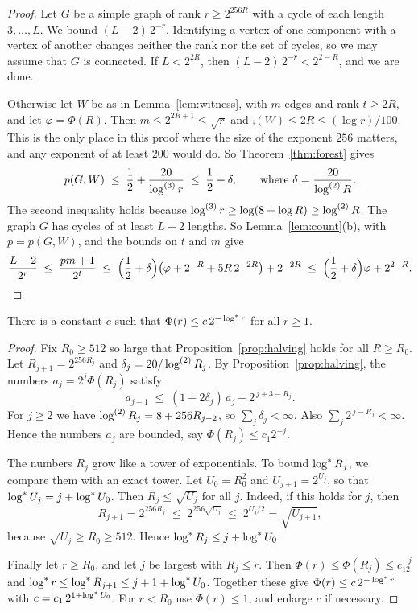 \begin{proof}
Let $G$ be a simple graph of rank $r\ge2^{256R}$ with a cycle of each length $3,\dots,L$. We bound
$(L-2)\,2^{-r}$. Identifying a vertex of one component with a vertex of another changes neither the
rank nor the set of cycles, so we may assume that $G$ is connected. If $L<2^{2R}$, then
$(L-2)\,2^{-r}<2^{2-R}$, and we are done.

Otherwise let $W$ be as in Lemma~\ref{lem:witness}, with $m$ edges and rank $t\ge2R$, and let
$\varphi=\Phi(R)$. Then $m\le2^{2R+1}\le\sqrt r$ and $\comp(W)\le2R\le(\log r)/100$. This is
the only place in this proof where the size of the exponent $256$ matters, and any exponent of at
least $200$ would do.
So Theorem~\ref{thm:forest} gives
\[
  p(G,W)\;\le\;\frac12+\frac{20}{\log^{(3)}r}\;\le\;\frac12+\delta,
  \qquad\text{where }\delta=\frac{20}{\log^{(2)}R}.
\]
The second inequality holds because $\log^{(3)}r\ge\log(8+\log R)\ge\log^{(2)}R$. The graph $G$ has cycles of
at least $L-2$ lengths. So Lemma~\ref{lem:count}(b), with $p=p(G,W)$, and the bounds on $t$ and $m$
give
\[
  \frac{L-2}{2^{r}}\;\le\;\frac{pm+1}{2^{t}}
  \;\le\;\Bigl(\frac12+\delta\Bigr)\bigl(\varphi+2^{-R}+5R\,2^{-2R}\bigr)+2^{-2R}
  \;\le\;\Bigl(\frac12+\delta\Bigr)\varphi+2^{2-R}.\qedhere
\]
\end{proof}

\begin{corollary}\label{cor:phi}
There is a constant $c$ such that $\Phi(r)\le c\,2^{-\log^{*} r}$ for all $r\ge1$.
\end{corollary}

\begin{proof}
Fix $R_0\ge512$ so large that Proposition~\ref{prop:halving} holds for all $R\ge R_0$. Let
$R_{j+1}=2^{256R_j}$ and $\delta_j=20/\log^{(2)}R_j$. By Proposition~\ref{prop:halving}, the numbers
$a_j=2^{j}\Phi(R_j)$ satisfy
\[
  a_{j+1}\;\le\;(1+2\delta_j)\,a_j+2^{\,j+3-R_j}.
\]
For $j\ge2$ we have $\log^{(2)}R_j=8+256R_{j-2}$, so $\sum_j\delta_j<\infty$. Also
$\sum_j2^{\,j-R_j}<\infty$. Hence the numbers $a_j$ are bounded, say $\Phi(R_j)\le c_1 2^{-j}$.

The numbers $R_j$ grow like a tower of exponentials. To bound $\log^{*} R_j$, we compare them with an
exact tower. Let $U_0=R_0^2$ and $U_{j+1}=2^{U_j}$, so that $\log^{*} U_j=j+\log^{*} U_0$. Then
$R_j\le\sqrt{U_j}$ for all $j$. Indeed, if this holds for $j$, then
\[
  R_{j+1}=2^{256R_j}\;\le\;2^{256\sqrt{U_j}}\;\le\;2^{U_j/2}=\sqrt{U_{j+1}},
\]
because $\sqrt{U_j}\ge R_0\ge512$. Hence $\log^{*} R_j\le j+\log^{*} U_0$.

Finally let $r\ge R_0$, and let $j$ be largest with $R_j\le r$. Then
$\Phi(r)\le\Phi(R_j)\le c_12^{-j}$ and $\log^{*} r\le\log^{*} R_{j+1}\le j+1+\log^{*} U_0$. Together these give
$\Phi(r)\le c\,2^{-\log^{*} r}$ with $c=c_1\,2^{1+\log^{*} U_0}$. For $r<R_0$ use $\Phi(r)\le1$, and enlarge
$c$ if necessary.
\end{proof}

